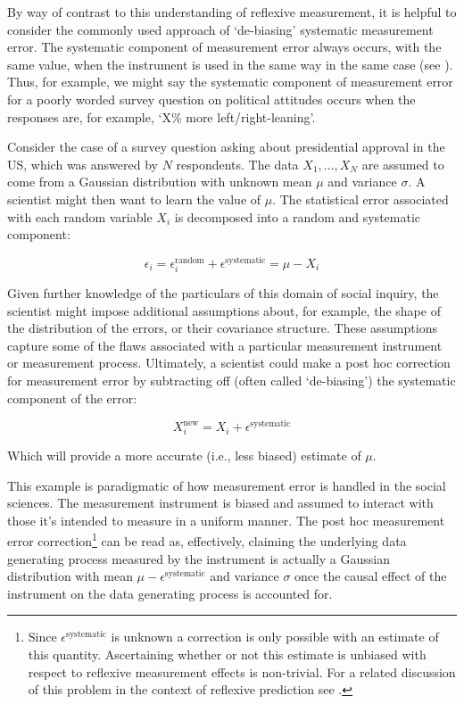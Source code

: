 By way of contrast to this understanding of reflexive measurement, it is helpful to consider the commonly used approach of `de-biasing' systematic measurement error. The systematic component of measurement error always occurs, with the same value, when the instrument is used in the same way in the same case (see \cite{tal2019}). Thus, for example, we might say the systematic component of measurement error for a poorly worded survey question on political attitudes occurs when the responses are, for example, `X\% more left/right-leaning'.

\begin{example}\label{ex_debias}
Consider the case of a survey question asking about presidential approval in the US, which was answered by $N$ respondents. The data $X_1, \dots, X_N$ are assumed to come from a Gaussian distribution with unknown mean $\mu$ and variance $\sigma$. A scientist might then want to learn the value of $\mu$. The statistical error associated with each random variable $X_i$ is decomposed into a random and systematic component:

\begin{equation*}
    \epsilon_i = \epsilon_i^{\text{random}} + \epsilon^{\text{systematic}} =  \mu - X_i
\end{equation*}

\noindent Given further knowledge of the particulars of this domain of social inquiry, the scientist might impose additional assumptions about, for example, the shape of the distribution of the errors, or their covariance structure. These assumptions capture some of the flaws associated with a particular measurement instrument or measurement process. Ultimately, a scientist could make a post hoc correction for measurement error by subtracting off (often called `de-biasing') the systematic component of the error:

\begin{equation*}
    X_i^{\text{new}} = X_i + \epsilon^{\text{systematic}}
\end{equation*}

\noindent Which will provide a more accurate (i.e., less biased) estimate of $\mu$.
\end{example}

This example is paradigmatic of how measurement error is handled in the social sciences. The measurement instrument is biased and assumed to interact with those it's intended to measure in a uniform manner. The post hoc measurement error correction\footnote{Since $\epsilon^{\text{systematic}}$ is unknown a correction is only possible with an estimate of this quantity. Ascertaining whether or not this estimate is unbiased with respect to reflexive measurement effects is non-trivial. For a related discussion of this problem in the context of reflexive prediction see \autocite{cejka2022}.} can be read as, effectively, claiming the underlying data generating process measured by the instrument is actually a Gaussian distribution with mean $\mu - \epsilon^{\text{systematic}}$ and variance $\sigma$ once the causal effect of the instrument on the data generating process is accounted for.

